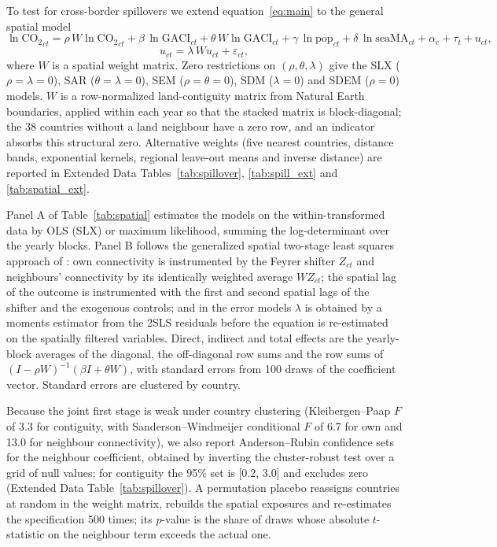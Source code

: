 \documentclass[12pt]{extarticle}
\begin{document}
To test for cross-border spillovers we extend equation~\ref{eq:main} to the general spatial model
\begin{equation}
\ln \mathrm{CO_2}_{ct} = \rho \, W \ln \mathrm{CO_2}_{ct} + \beta \,\ln \mathrm{GACI}_{ct} + \theta \, W \ln \mathrm{GACI}_{ct}
 + \gamma \,\ln \mathrm{pop}_{ct} + \delta \,\ln \mathrm{seaMA}_{ct} + \alpha_c + \tau_t + u_{ct},
\label{eq:spatial_general}
\end{equation}
\begin{equation}
u_{ct} = \lambda \, W u_{ct} + \varepsilon_{ct},
\label{eq:spatial_error}
\end{equation}
where $W$ is a spatial weight matrix. Zero restrictions on $(\rho,\theta,\lambda)$ give the SLX ($\rho=\lambda=0$), SAR ($\theta=\lambda=0$), SEM ($\rho=\theta=0$), SDM ($\lambda=0$) and SDEM ($\rho=0$) models. $W$ is a row-normalized land-contiguity matrix from Natural Earth boundaries, applied within each year so that the stacked matrix is block-diagonal; the 38 countries without a land neighbour have a zero row, and an indicator absorbs this structural zero. Alternative weights (five nearest countries, distance bands, exponential kernels, regional leave-out means and inverse distance) are reported in Extended Data Tables~\ref{tab:spillover}, \ref{tab:spill_ext} and \ref{tab:spatial_ext}.

Panel A of Table~\ref{tab:spatial} estimates the models on the within-transformed data by OLS (SLX) or maximum likelihood, summing the log-determinant over the yearly blocks. Panel B follows the generalized spatial two-stage least squares approach of \citet{kelejian1998}: own connectivity is instrumented by the Feyrer shifter $Z_{ct}$ and neighbours' connectivity by its identically weighted average $WZ_{ct}$; the spatial lag of the outcome is instrumented with the first and second spatial lags of the shifter and the exogenous controls; and in the error models $\lambda$ is obtained by a moments estimator from the 2SLS residuals before the equation is re-estimated on the spatially filtered variables. Direct, indirect and total effects are the yearly-block averages of the diagonal, the off-diagonal row sums and the row sums of $(I-\rho W)^{-1}(\beta I + \theta W)$, with standard errors from 100 draws of the coefficient vector. Standard errors are clustered by country.

Because the joint first stage is weak under country clustering (Kleibergen--Paap $F$ of 3.3 for contiguity, with Sanderson--Windmeijer conditional $F$ of 6.7 for own and 13.0 for neighbour connectivity), we also report Anderson--Rubin confidence sets for the neighbour coefficient, obtained by inverting the cluster-robust test over a grid of null values; for contiguity the 95\% set is [0.2, 3.0] and excludes zero (Extended Data Table~\ref{tab:spillover}). A permutation placebo reassigns countries at random in the weight matrix, rebuilds the spatial exposures and re-estimates the specification 500 times; its $p$-value is the share of draws whose absolute $t$-statistic on the neighbour term exceeds the actual one.
\end{document}
